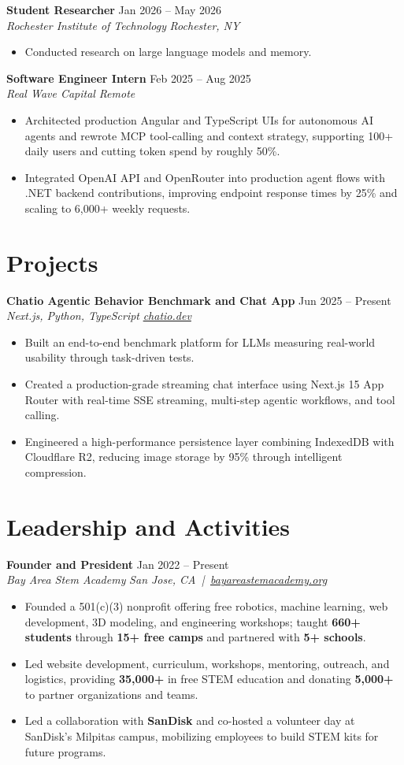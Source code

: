 \documentclass[10pt,letterpaper]{article}
\newif\ifresumeFirstRole
\newcommand{\resumeRole}[4]{%
  \ifresumeFirstRole
    \global\resumeFirstRolefalse
  \else
    \vspace{0pt plus 1fill}%
  \fi
  \textbf{#1} \hfill #2\\
  \textit{#3} \hfill \textit{#4}
}
\begin{document}
\resumeRole{Student Researcher}{Jan 2026 -- May 2026}{Rochester Institute of Technology}{Rochester, NY}
\begin{itemize}
  \item Conducted research on large language models and memory.
\end{itemize}

\resumeRole{Software Engineer Intern}{Feb 2025 -- Aug 2025}{Real Wave Capital}{Remote}
\begin{itemize}
  \item Architected production Angular and TypeScript UIs for autonomous AI agents and rewrote MCP tool-calling and context strategy, supporting 100+ daily users and cutting token spend by roughly 50\%.
  \item Integrated OpenAI API and OpenRouter into production agent flows with .NET backend contributions, improving endpoint response times by 25\% and scaling to 6,000+ weekly requests.
\end{itemize}

\section*{Projects}
\resumeRole{Chatio Agentic Behavior Benchmark and Chat App}{Jun 2025 -- Present}{Next.js, Python, TypeScript}{\href{https://chatio.dev}{chatio.dev}}
\begin{itemize}
  \item Built an end-to-end benchmark platform for LLMs measuring real-world usability through task-driven tests.
  \item Created a production-grade streaming chat interface using Next.js 15 App Router with real-time SSE streaming, multi-step agentic workflows, and tool calling.
  \item Engineered a high-performance persistence layer combining IndexedDB with Cloudflare R2, reducing image storage by 95\% through intelligent compression.
\end{itemize}

\section*{Leadership and Activities}
\resumeRole{Founder and President}{Jan 2022 -- Present}{Bay Area Stem Academy}{San Jose, CA \,|\, \href{https://bayareastemacademy.org}{bayareastemacademy.org}}
\begin{itemize}
  \item Founded a 501(c)(3) nonprofit offering free robotics, machine learning, web development, 3D modeling, and engineering workshops; taught \textbf{660+ students} through \textbf{15+ free camps} and partnered with \textbf{5+ schools}.
  \item Led website development, curriculum, workshops, mentoring, outreach, and logistics, providing \textbf{\textdollar{}35,000+} in free STEM education and donating \textbf{\textdollar{}5,000+} to partner organizations and teams.
  \item Led a collaboration with \textbf{SanDisk} and co-hosted a volunteer day at SanDisk's Milpitas campus, mobilizing employees to build STEM kits for future programs.
\end{itemize}
\end{document}
